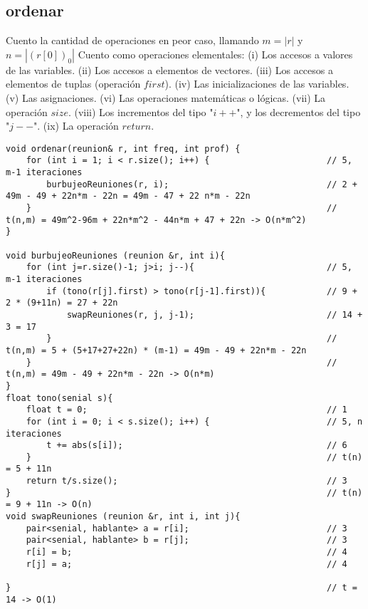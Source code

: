 \documentclass{article}
\begin{document}
\subsection{ordenar}
Cuento la cantidad de operaciones en peor caso, llamando $m=|r|$ y $n=|(r[0])_0|$ \newline
Cuento como operaciones elementales: \newline
(i) Los accesos a valores de las variables. \newline
(ii) Los accesos a elementos de vectores. \newline
(iii) Los accesos a elementos de tuplas (operación $first$). \newline
(iv) Las inicializaciones de las variables. \newline
(v) Las asignaciones. \newline
(vi) Las operaciones matemáticas o lógicas. \newline
(vii) La operación $size$. \newline
(viii) Los incrementos del tipo "$i++$", y los decrementos del tipo "$j--$". \newline
(ix) La operación $return$. \newline

\begin{lstlisting}
void ordenar(reunion& r, int freq, int prof) {
    for (int i = 1; i < r.size(); i++) {                       // 5, m-1 iteraciones
        burbujeoReuniones(r, i);                               // 2 + 49m - 49 + 22n*m - 22n = 49m - 47 + 22 n*m - 22n
    }                                                          // t(n,m) = 49m^2-96m + 22n*m^2 - 44n*m + 47 + 22n -> O(n*m^2)
}

void burbujeoReuniones (reunion &r, int i){
    for (int j=r.size()-1; j>i; j--){                          // 5, m-1 iteraciones
        if (tono(r[j].first) > tono(r[j-1].first)){            // 9 + 2 * (9+11n) = 27 + 22n
            swapReuniones(r, j, j-1);                          // 14 + 3 = 17
        }                                                      // t(n,m) = 5 + (5+17+27+22n) * (m-1) = 49m - 49 + 22n*m - 22n
    }                                                          // t(n,m) = 49m - 49 + 22n*m - 22n -> O(n*m)
}
float tono(senial s){
    float t = 0;                                               // 1
    for (int i = 0; i < s.size(); i++) {                       // 5, n iteraciones
        t += abs(s[i]);                                        // 6
    }                                                          // t(n) = 5 + 11n
    return t/s.size();                                         // 3
}                                                              // t(n) = 9 + 11n -> O(n)
void swapReuniones (reunion &r, int i, int j){
    pair<senial, hablante> a = r[i];                           // 3
    pair<senial, hablante> b = r[j];                           // 3
    r[i] = b;                                                  // 4
    r[j] = a;                                                  // 4

}                                                              // t = 14 -> O(1)
\end{lstlisting}
\end{document}
